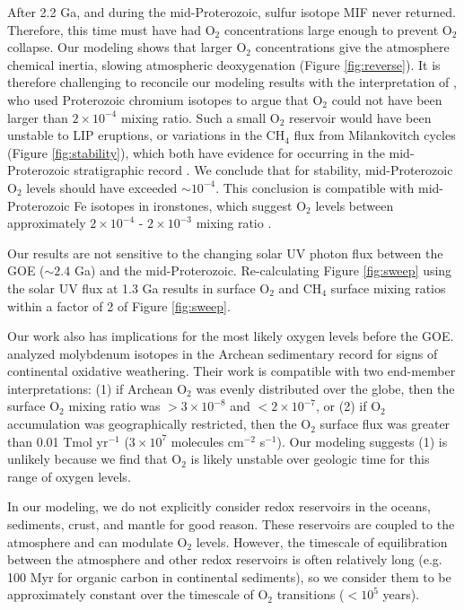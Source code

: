 After 2.2 Ga, and during the mid-Proterozoic, sulfur isotope MIF never returned. Therefore, this time must have had O$_2$ concentrations large enough to prevent O$_2$ collapse. Our modeling shows that larger O$_2$ concentrations give the atmosphere chemical inertia, slowing atmospheric deoxygenation (Figure \ref{fig:reverse}). It is therefore challenging to reconcile our modeling results with the interpretation of \citet{Planavsky_2014_proto}, who used Proterozoic chromium isotopes to argue that O$_2$ could not have been larger than $2 \times 10^{-4}$ mixing ratio. Such a small O$_2$ reservoir would have been unstable to LIP eruptions, or variations in the CH$_4$ flux from Milankovitch cycles (Figure \ref{fig:stability}), which both have evidence for occurring in the mid-Proterozoic stratigraphic record \citep{Zhang_2015,Meyers_2018,Lecheminant_1989}. We conclude that for stability, mid-Proterozoic O$_2$ levels should have exceeded $\sim 10^{-4}$. This conclusion is compatible with mid-Proterozoic Fe isotopes in ironstones, which suggest O$_2$ levels between approximately $2 \times 10^{-4}$ - $2 \times 10^{-3}$ mixing ratio \citep{Wang_2022}.

Our results are not sensitive to the changing solar UV photon flux between the GOE ($\sim 2.4$ Ga) and the mid-Proterozoic. Re-calculating Figure \ref{fig:sweep} using the solar UV flux at 1.3 Ga \citep{Claire_2012} results in surface O$_2$ and CH$_4$ surface mixing ratios within a factor of 2 of Figure \ref{fig:sweep}.

Our work also has implications for the most likely oxygen levels before the GOE. \citet{Johnson_2021} analyzed molybdenum isotopes in the Archean sedimentary record for signs of continental oxidative weathering. Their work is compatible with two end-member interpretations: (1) if Archean O$_2$ was evenly distributed over the globe, then the surface O$_2$ mixing ratio was $> 3 \times 10^{-8}$ and $< 2 \times 10^{-7}$, or (2) if O$_2$ accumulation was geographically restricted, then the O$_2$ surface flux was greater than 0.01 Tmol yr$^{-1}$ ($3 \times 10^{7}$ molecules cm$^{-2}$ s$^{-1}$). Our modeling suggests (1) is unlikely because we find that O$_2$ is likely unstable over geologic time for this range of oxygen levels.

In our modeling, we do not explicitly consider redox reservoirs in the oceans, sediments, crust, and mantle for good reason. These reservoirs are coupled to the atmosphere and can modulate O$_2$ levels. However, the timescale of equilibration between the atmosphere and other redox reservoirs is often relatively long (e.g. 100 Myr for organic carbon in continental sediments), so we consider them to be approximately constant over the timescale of O$_2$ transitions ($<10^5$ years).

